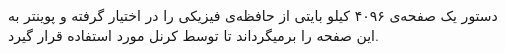 دستور
یک صفحه‌ی ۴۰۹۶ کیلو بایتی از حافظه‌ی فیزیکی را در اختیار گرفته و پوینتر به این صفحه را برمیگرداند تا توسط کرنل مورد استفاده قرار گیرد.
